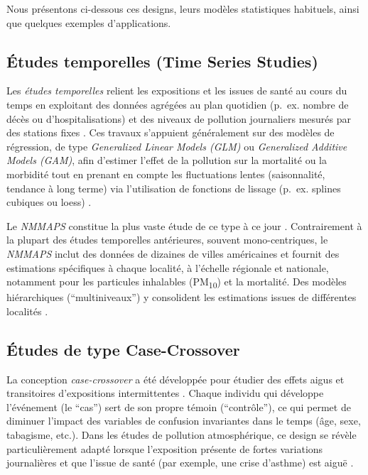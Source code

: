 Nous présentons ci-dessous ces designs, leurs modèles statistiques habituels, ainsi que quelques exemples d'applications.

\subsection{Études temporelles (Time Series Studies)}
Les \emph{études temporelles} relient les expositions et les issues de santé au cours du temps en exploitant des données agrégées au plan quotidien (p.~ex. nombre de décès ou d'hospitalisations) et des niveaux de pollution journaliers mesurés par des stations fixes \citep{BellSametDominici2004}. Ces travaux s'appuient généralement sur des modèles de régression, de type \emph{Generalized Linear Models (GLM)} ou \emph{Generalized Additive Models (GAM)}, afin d'estimer l'effet de la pollution sur la mortalité ou la morbidité tout en prenant en compte les fluctuations lentes (saisonnalité, tendance à long terme) via l'utilisation de fonctions de lissage (p.~ex. splines cubiques ou loess) \citep{McCullaghNelder1989,HastieTibshirani1990}.

Le \emph{NMMAPS} constitue la plus vaste étude de ce type à ce jour \citep{DominiciMcDermottDaniels2003,SametDominiciZeger2000,SametZegerDominici2000,SametDominiciCurriero2000,DominiciPengZeger2007,BellMcDermottZeger2004,PengDominiciPastorBarriuso2005,DominiciSametZeger2000}. Contrairement à la plupart des études temporelles antérieures, souvent mono-centriques, le \emph{NMMAPS} inclut des données de dizaines de villes américaines et fournit des estimations spécifiques à chaque localité, à l'échelle régionale et nationale, notamment pour les particules inhalables (PM\textsubscript{10}) et la mortalité. Des modèles hiérarchiques (``multiniveaux'') y consolident les estimations issues de différentes localités \citep{DominiciSametZeger2000}.

\subsection{Études de type Case-Crossover}
La conception \emph{case-crossover} \citep{Maclure1991,Jaakkola2003,MaclureMittleman2000} a été développée pour étudier des effets aigus et transitoires d'expositions intermittentes \citep{BreslowDay1980,Schlesselman1994}. Chaque individu qui développe l'événement (le ``cas'') sert de son propre témoin (``contrôle''), ce qui permet de diminuer l'impact des variables de confusion invariantes dans le temps (âge, sexe, tabagisme, etc.). Dans les études de pollution atmosphérique, ce design se révèle particulièrement adapté lorsque l'exposition présente de fortes variations journalières et que l'issue de santé (par exemple, une crise d'asthme) est aiguë \citep{MaclureMittleman2000,Jaakkola2003}.

